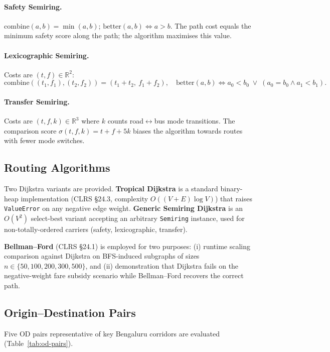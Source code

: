 \documentclass[12pt,a4paper]{article}
\newcommand{\R}{\mathbb{R}}
\begin{document}
\paragraph{Safety Semiring.}
$\mathrm{combine}(a, b) = \min(a, b)$;\quad
$\mathrm{better}(a, b) \Leftrightarrow a > b$.
The path cost equals the minimum safety score along the path; the algorithm
maximises this value.

\paragraph{Lexicographic Semiring.}
Costs are $(t, f) \in \R^2$:
\[
  \mathrm{combine}((t_1,f_1),(t_2,f_2)) = (t_1{+}t_2,\ f_1{+}f_2),
  \quad
  \mathrm{better}(a, b) \Leftrightarrow
  a_0 < b_0 \;\vee\; (a_0 = b_0 \wedge a_1 < b_1).
\]

\paragraph{Transfer Semiring.}
Costs are $(t, f, k) \in \R^3$ where $k$ counts road$\leftrightarrow$bus
mode transitions.  The comparison score $\sigma(t,f,k) = t + f + 5k$
biases the algorithm towards routes with fewer mode switches.

\subsection{Routing Algorithms}

Two Dijkstra variants are provided.  \textbf{Tropical Dijkstra} is a
standard binary-heap implementation (CLRS §24.3, complexity
$O((V+E)\log V)$) that raises \texttt{ValueError} on any negative edge
weight.  \textbf{Generic Semiring Dijkstra} is an $O(V^2)$ select-best
variant accepting an arbitrary \texttt{Semiring} instance, used for
non-totally-ordered carriers (safety, lexicographic, transfer).

\textbf{Bellman--Ford} (CLRS §24.1) is employed for two purposes:
(i) runtime scaling comparison against Dijkstra on BFS-induced subgraphs of
sizes $n \in \{50, 100, 200, 300, 500\}$, and (ii) demonstration that
Dijkstra fails on the negative-weight fare subsidy scenario while
Bellman--Ford recovers the correct path.

\subsection{Origin--Destination Pairs}

Five OD pairs representative of key Bengaluru corridors are evaluated
(Table~\ref{tab:od-pairs}).
\end{document}

